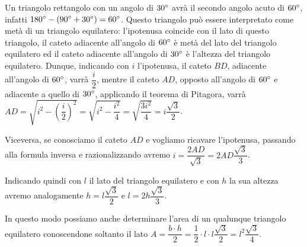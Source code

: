 \begin{wrapfigure}{r}{0.25\textwidth}
	\centering
\end{wrapfigure}
Un triangolo rettangolo con un angolo di $30{}^{\circ}$ avrà il secondo angolo acuto di $60{}^{\circ}$, infatti $180{}^{\circ}- (90{}^{\circ}+30{}^{\circ})=60{}^{\circ}$. Questo triangolo può essere interpretato come metà di un triangolo equilatero: l'ipotenusa coincide con il lato di questo triangolo, il cateto adiacente all'angolo di $60{}^{\circ}$ è metà del lato del triangolo equilatero ed il cateto adiacente all'angolo di $30{}^{\circ}$ è l'altezza del triangolo equilatero.
Dunque, indicando con $i$ l'ipotenusa, il cateto $BD$, adiacente all'angolo di $60{}^{\circ}$, varrà $\dfrac{i}{2}$, mentre il cateto $AD$, opposto all'angolo di $60{}^{\circ}$ e adiacente a quello di $30{}^{\circ}$, applicando il teorema di Pitagora, varrà $AD=\sqrt{i^2-\left(\dfrac{i}{2}\right)^2}=\sqrt{i^2-\dfrac{i^2}{4}}=\sqrt{\dfrac{3i^2}{4}}=i\dfrac{\sqrt{3}}{2}$.

Viceversa, se conosciamo il cateto $AD$ e vogliamo ricavare l'ipotenusa, passando alla formula inversa e razionalizzando avremo $i=\dfrac{2AD}{\sqrt{3}}=2AD\dfrac{\sqrt{3}}{3}$.

Indicando quindi con $l$ il lato del triangolo equilatero e con $h$ la sua altezza avremo analogamente $h=l\dfrac{\sqrt{3}}{2}$ e $l=2h\dfrac{\sqrt{3}}{3}$.

In questo modo possiamo anche determinare l'area di un qualunque triangolo equilatero conoscendone soltanto il lato $A=\dfrac{b\cdot h}{2}=\dfrac{1}{2}\cdot l\cdot l\dfrac{\sqrt{3}}{2}=l^2\dfrac{\sqrt{3}}{4}$.

